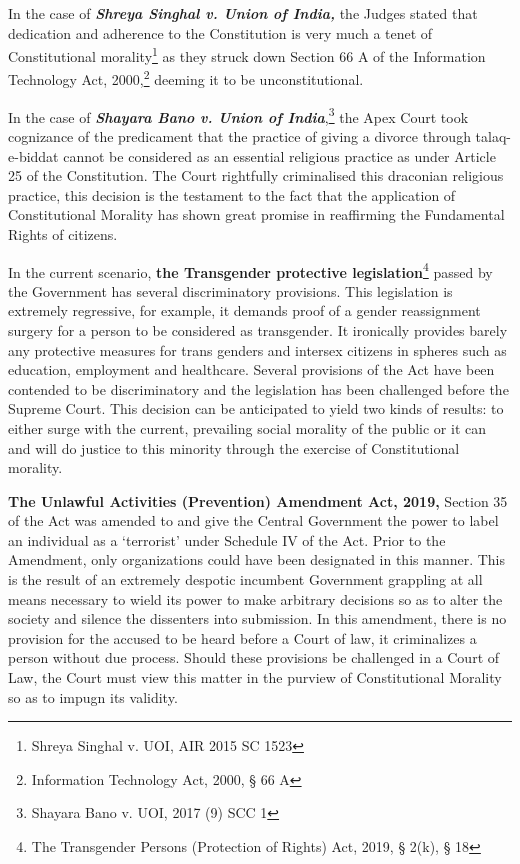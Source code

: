 \begin{multicols}{2}
\vspace{-.1cm}

\noi
In the case of \textbf{\textit{Shreya Singhal v. Union of India,}} the Judges stated that dedication and
adherence to the Constitution is very much a tenet of Constitutional morality\footnote{Shreya Singhal v. UOI, AIR 2015 SC 1523} as they struck down Section 66 A of the Information Technology Act, 2000,\footnote{Information Technology Act, 2000, § 66 A} deeming it to be
unconstitutional.

\vspace{-.1cm}

\noi
In the case of \textbf{\textit{Shayara Bano v. Union of India}},\footnote{Shayara Bano v. UOI, 2017 (9) SCC 1} the Apex Court took cognizance of the
predicament that the practice of giving a divorce through talaq-e-biddat cannot be considered
as an essential religious practice as under Article 25 of the Constitution. The Court rightfully
criminalised this draconian religious practice, this decision is the testament to the fact that the
application of Constitutional Morality has shown great promise in reaffirming the
Fundamental Rights of citizens.

\vspace{-.1cm}

\noi
In the current scenario, \textbf{the Transgender protective legislation}\footnote{The Transgender Persons (Protection of Rights) Act, 2019, § 2(k), § 18} passed by the Government
has several discriminatory provisions. This legislation is extremely regressive, for example, it
demands proof of a gender reassignment surgery for a person to be considered as transgender.
It ironically provides barely any protective measures for trans genders and intersex citizens in
spheres such as education, employment and healthcare. Several provisions of the Act have
been contended to be discriminatory and the legislation has been challenged before the
Supreme Court. This decision can be anticipated to yield two kinds of results: to either surge
with the current, prevailing social morality of the public or it can and will do justice to this
minority through the exercise of Constitutional morality.

\vspace{-.1cm}

\noi
\textbf{The Unlawful Activities (Prevention) Amendment Act, 2019,} Section 35 of the Act was
amended to and give the Central Government the power to label an individual as a ‘terrorist’
under Schedule IV of the Act. Prior to the Amendment, only organizations could have been
designated in this manner. This is the result of an extremely despotic incumbent Government
grappling at all means necessary to wield its power to make arbitrary decisions so as to alter
the society and silence the dissenters into submission. In this amendment, there is no
provision for the accused to be heard before a Court of law, it criminalizes a person without
due process. Should these provisions be challenged in a Court of Law, the Court must view
this matter in the purview of Constitutional Morality so as to impugn its validity.


\end{multicols}
